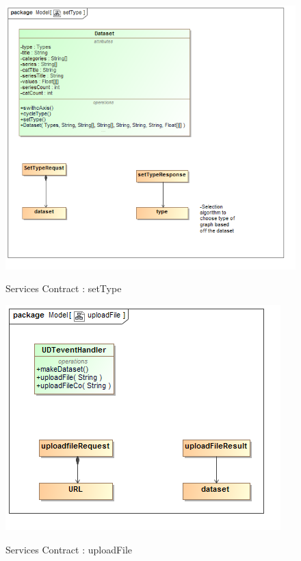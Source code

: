 \documentclass[a4paper,12pt]{article}
\begin{document}
	\begin{figure}[H]
		\includegraphics[width=\textwidth]{Images/setType.png}  \\
		\caption{Services Contract : setType}
	\end{figure}
	
	\begin{figure}[H]
		\includegraphics[width=\textwidth]{Images/uploadFile.png}  \\
		\caption{Services Contract : uploadFile}
	\end{figure}
	
\end{document}
